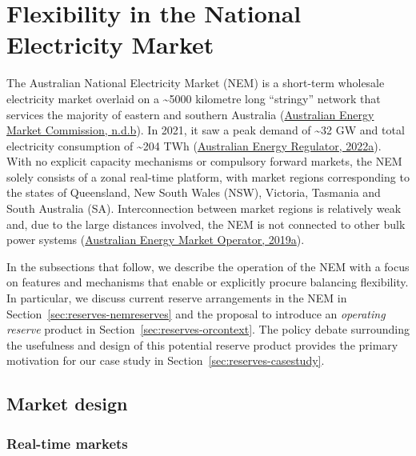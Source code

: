 \documentclass[12pt,a4paper,]{report}
\begin{document}
\hypertarget{sec:reserves-flexnem}{%
\section{Flexibility in the National Electricity
Market}\label{sec:reserves-flexnem}}

The Australian National Electricity Market (NEM) is a short-term
wholesale electricity market overlaid on a \textasciitilde5000 kilometre
long ``stringy'' network that services the majority of eastern and
southern Australia
(\protect\hyperlink{ref-australianenergymarketcommissionElectricitySupplyChain}{Australian
Energy Market Commission, n.d.b}). In 2021, it saw a peak demand of
\textasciitilde32 GW and total electricity consumption of
\textasciitilde204 TWh
(\protect\hyperlink{ref-australianenergyregulatorStateEnergyMarket2022}{Australian
Energy Regulator, 2022a}). With no explicit capacity mechanisms or
compulsory forward markets, the NEM solely consists of a zonal real-time
platform, with market regions corresponding to the states of Queensland,
New South Wales (NSW), Victoria, Tasmania and South Australia (SA).
Interconnection between market regions is relatively weak and, due to
the large distances involved, the NEM is not connected to other bulk
power systems
(\protect\hyperlink{ref-australianenergymarketoperatorMaintainingPowerSystem2019}{Australian
Energy Market Operator, 2019a}).

In the subsections that follow, we describe the operation of the NEM
with a focus on features and mechanisms that enable or explicitly
procure balancing flexibility. In particular, we discuss current reserve
arrangements in the NEM in Section~\ref{sec:reserves-nemreserves} and
the proposal to introduce an \emph{operating reserve} product in
Section~\ref{sec:reserves-orcontext}. The policy debate surrounding the
usefulness and design of this potential reserve product provides the
primary motivation for our case study in
Section~\ref{sec:reserves-casestudy}.

\hypertarget{market-design}{%
\subsection{Market design}\label{market-design}}

\hypertarget{real-time-markets}{%
\subsubsection{Real-time markets}\label{real-time-markets}}
\end{document}
